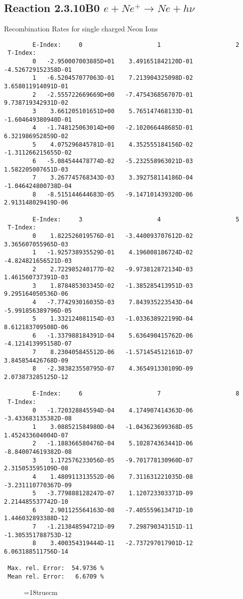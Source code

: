 \subsection{
Reaction 2.3.10B0   $e + Ne^+ \rightarrow  Ne + h\nu$
}

 Recombination Rates for single
 charged Neon Ions

\begin{verbatim}
        E-Index:     0                     1                     2
 T-Index:
        0   -2.950007003885D+01    3.491651842120D-01   -4.526729152358D-01
        1   -6.520457077063D-01    7.213904325098D-02    3.658011914091D-01
        2   -2.555722669669D+00   -7.475436856707D-01    9.738719342931D-02
        3    3.661205101651D+00    5.765147468133D-01   -1.604649380940D-01
        4   -1.748125063014D+00   -2.102066448685D-01    6.321986952859D-02
        5    4.075296845781D-01    4.352555184156D-02   -1.311266215655D-02
        6   -5.084544478774D-02   -5.232558963021D-03    1.582205007651D-03
        7    3.267745768343D-03    3.392758114186D-04   -1.046424800738D-04
        8   -8.515144644683D-05   -9.147101439320D-06    2.913148029419D-06

        E-Index:     3                     4                     5
 T-Index:
        0    1.822526019576D-01   -3.440093707612D-02    3.365607055965D-03
        1   -1.925738935529D-01    4.196008186724D-02   -4.824821656521D-03
        2    2.722985240177D-02   -9.973812872134D-03    1.461560737391D-03
        3    1.878485303345D-02   -1.385285413951D-03    9.295164050536D-06
        4   -7.774293016035D-03    7.843935223543D-04   -5.991856389796D-05
        5    1.332124081154D-03   -1.033638922199D-04    8.612183709508D-06
        6   -1.337988184391D-04    5.636490415762D-06   -4.121413995158D-07
        7    8.230405845512D-06   -1.571454512161D-07    3.845854426768D-09
        8   -2.383823550795D-07    4.365491330109D-09    2.073873285125D-12

        E-Index:     6                     7                     8
 T-Index:
        0   -1.720328845594D-04    4.174907414363D-06   -3.433683135382D-08
        1    3.088521584980D-04   -1.043623699368D-05    1.452433604004D-07
        2   -1.188366580476D-04    5.102874363441D-06   -8.840074619382D-08
        3    1.172576233056D-05   -9.701778130960D-07    2.315053595109D-08
        4    1.480911313552D-06    7.311631221035D-08   -3.231110770367D-09
        5   -3.779888128247D-07    1.120723303371D-09    2.214485537742D-10
        6    2.901125564163D-08   -7.405559613471D-10    1.446032893388D-12
        7   -1.213848594721D-09    7.298790343151D-11   -1.305351788753D-12
        8    3.400354319444D-11   -2.737297017901D-12    6.063188511756D-14

 Max. rel. Error:  54.9736 %
 Mean rel. Error:   6.6709 %

\end{verbatim}
\begin{figure} \label{2.3.10B0}
\epsfxsize=18truecm
\end{figure}
\newpage
